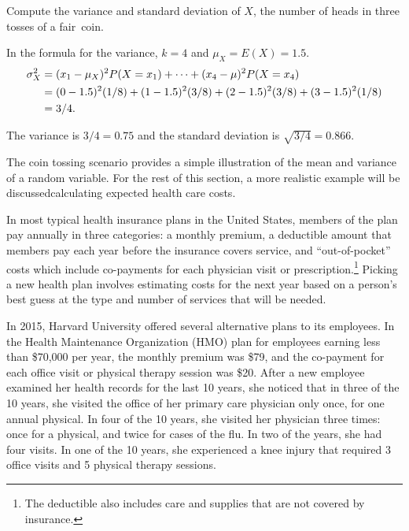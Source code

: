 \begin{examplewrap}
\begin{nexample}{Compute the variance and standard deviation of $X$, the number of heads in three tosses of a fair~coin.}
	
	In the formula for the variance, $k = 4$ and $\mu_X = E(X) = 1.5$. 
	\begin{align*}
	\sigma_X^2 &= (x_1-\mu_X)^2P(X=x_1) + \cdots \notag + (x_4-\mu)^2 P(X=x_4) \notag \\
	&= (0- 1.5)^2(1/8) + (1 - 1.5)^2 (3/8) + 
	(2 -1.5)^2 (3/8) + (3-1.5)^2 (1/8) \notag \\
	&= 3/4.
	\end{align*}
	
	The variance is $3/4 = 0.75$ and the standard deviation is $\sqrt{3/4} = 0.866$.  
\end{nexample}
\end{examplewrap}

The coin tossing scenario provides a simple illustration of the mean and variance of a random variable. For the rest of this section, a more realistic example will be discussed\textemdash calculating expected health care costs.

In most typical health insurance plans in the United States, members of the plan pay annually in three categories: a monthly premium, a deductible amount that members pay each year before the insurance covers service, and ``out-of-pocket'' costs which include co-payments for each physician visit or prescription.\footnote{The deductible also includes care and supplies that are not covered by insurance.} Picking a new health plan involves estimating costs for the next year based on a person's best guess at the type and number of services that will be needed.

\textD{\newpage}

In 2015, Harvard University offered several alternative plans to its employees. In the Health Maintenance Organization (HMO) plan for employees earning less than \$70,000 per year, the monthly premium was \$79, and the co-payment for each office visit or physical therapy session was \$20. After a new employee examined her health records for the last 10 years, she noticed that in three of the 10 years, she visited the office of her primary care physician only once, for one annual physical. In four of the 10 years, she visited her physician three times: once for a physical, and twice for cases of the flu. In two of the years, she had four visits. In one of the 10 years, she experienced a knee injury that required 3 office visits and 5 physical therapy sessions.

